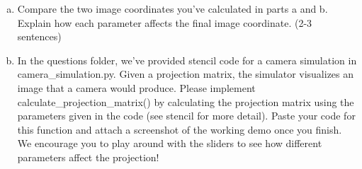 \begin{enumerate} [(a)]
\begin{enumerate} [(i)]
\item A camera with focal length in both $x$ and $y$ directions of $2$,\\a translation of $5$ along the x-axis, and\\ no skew or rotation.
\vspace{-0.3cm}
\begin{align}
    \begin{pmatrix} 
    \_\_ & \_\_ & $0$ \\ 
    $0$ & \_\_ & $0$ \\ 
    $0$ & $0$ & $1$ \end{pmatrix} *
    \begin{pmatrix} 
    \_\_ & \_\_ & \_\_ & \_\_ \\ 
    \_\_ & \_\_ & \_\_ & \_\_ \\ 
    \_\_ & \_\_ & \_\_ & \_\_ \end{pmatrix} * 
    \begin{pmatrix} 
    $30$ \\ 
    $-20$ \\ 
    $10$ \\ 
    $1$ \end{pmatrix}
    = \begin{pmatrix}  \_\_ \\ \_\_ \\ \_\_ \end{pmatrix}
    = \_\_ * \begin{pmatrix}  \_\_ \\ \_\_ \\ $1$ \end{pmatrix}
\end{align}

\end{enumerate}
\item Compare the two image coordinates you've calculated in parts a and b. Explain how each parameter affects the final image coordinate. (2-3 sentences)

\item In the questions folder, we've provided stencil code for a camera simulation in camera\_simulation.py. Given a projection matrix, the simulator visualizes an image that a camera would produce. Please implement calculate\_projection\_matrix() by calculating the projection matrix using the parameters given in the code (see stencil for more detail). Paste your code for this function and attach a screenshot of the working demo once you finish. We encourage you to play around with the sliders to see how different parameters affect the projection!

\end{enumerate}

